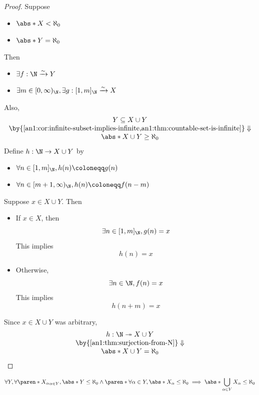 \begin{proof}
  Suppose
  \begin{itemize}
    \item $\abs*{X} < \aleph_{0}$
    \item $\abs*{Y} = \aleph_{0}$
  \end{itemize}
  Then
  \begin{itemize}
    \item $\exists f: \N \xrightarrow{\sim} Y$
    \item $\exists m \in [0, \infty)_{\N}, \exists g: [1, m]_{\N} \xrightarrow{\sim} X$
  \end{itemize}
  Also,
  \[
    \begin{array}{c}
      Y \subseteq X \cup Y                                                                              \\
      \by{\Cref{an1:cor:infinite-subset-implies-infinite,an1:thm:countable-set-is-infinite}} \Downarrow \\
      \abs*{X \cup Y} \geq \aleph_{0}
    \end{array}
  \]
  Define $h: \N \to X \cup Y$ by
  \begin{itemize}
    \item $\forall n \in [1, m]_{\N}, h(n) \coloneqq g(n)$
    \item $\forall n \in [m + 1, \infty)_{\N}, h(n) \coloneqq f(n - m)$
  \end{itemize}
  Suppose $x \in X \cup Y$. Then
  \begin{itemize}
    \item If $x \in X$, then
          \[
            \exists n \in [1, m]_{\N}, g(n) = x
          \]
          This implies
          \[
            h(n) = x
          \]
    \item Otherwise,
          \[
            \exists n \in \N, f(n) = x
          \]
          This implies
          \[
            h(n + m) = x
          \]
  \end{itemize}
  Since $x \in X \cup Y$ was arbitrary,
  \[
    \begin{array}{c}
      h: \N \twoheadrightarrow X \cup Y                \\
      \by{\Cref{an1:thm:surjection-from-N}} \Downarrow \\
      \abs*{X \cup Y} = \aleph_{0}
    \end{array}
  \]
\end{proof}

\begin{theorem} \label{an1:thm:at-most-countable-union-of-at-most-countable-sets-is-at-most-countable}
  \[
    \forall Y, \forall \paren*{X_{\alpha}}_{\alpha \in Y}, \abs*{Y} \leq \aleph_{0}
    \land \paren*{\forall \alpha \in Y, \abs*{X_{\alpha}} \leq \aleph_{0}}
    \implies \abs*{\bigcup_{\alpha \in Y} X_{\alpha}} \leq \aleph_{0}
  \]
\end{theorem}

